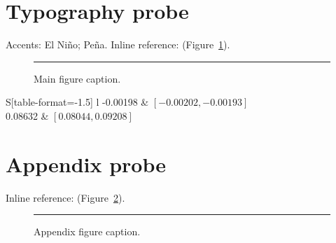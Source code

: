\documentclass[APA,STIX1COL]{WileyNJD-v2}
\begin{document}
\section{Typography probe}
Accents: El Niño; Peña. Inline reference: (Figure~\ref{fig:probe}).
\begin{figure}[h]\centering\rule{80pt}{6pt}\caption{Main figure caption.}\label{fig:probe}\end{figure}
\begin{tabular}{S[table-format=-1.5] l}
-0.00198 & $[-0.00202,-0.00193]$\\
0.08632 & $[0.08044,0.09208]$
\end{tabular}
\appendix

\section{Appendix probe}
Inline reference: (Figure~\ref{fig:app}).
\begin{figure}[h]\centering\rule{80pt}{6pt}\caption{Appendix figure caption.}\label{fig:app}\end{figure}
\end{document}
